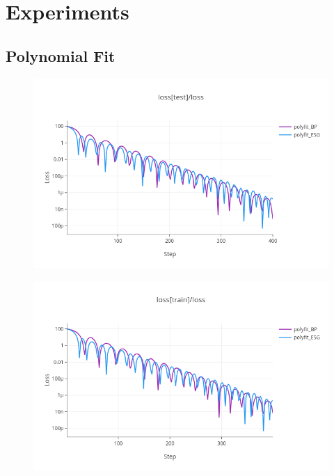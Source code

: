 \documentclass[nohyperref]{article}
\theoremstyle{plain}
\theoremstyle{definition}
\theoremstyle{remark}
\begin{document}
\section{Experiments}

\subsection{Polynomial Fit}
\begin{figure}[ht]
\vskip 0.2in
\begin{center}
\centerline{\includegraphics[width=\columnwidth]{images/polyfit_test.png}}
\caption{}
\end{center}
\vskip -0.2in
\end{figure}
\begin{figure}[ht]
\vskip 0.2in
\begin{center}
\centerline{\includegraphics[width=\columnwidth]{images/polyfit_train.png}}
\caption{}
\end{center}
\vskip -0.2in
\end{figure}
\end{document}

